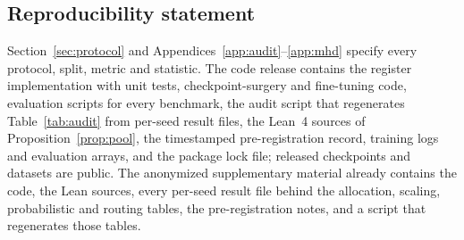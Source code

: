 \documentclass{article}
\begin{document}
\subsection*{Reproducibility statement}
Section~\ref{sec:protocol} and Appendices~\ref{app:audit}--\ref{app:mhd} specify every protocol, split, metric and
statistic. The code release contains the register implementation with unit tests, checkpoint-surgery and fine-tuning
code, evaluation scripts for every benchmark, the audit script that regenerates Table~\ref{tab:audit} from per-seed
result files, the Lean~4 sources of Proposition~\ref{prop:pool}, the timestamped pre-registration record, training
logs and evaluation arrays, and the package lock file; released checkpoints and datasets are public. The anonymized
supplementary material already contains the code, the Lean sources, every per-seed result file behind the allocation,
scaling, probabilistic and routing tables, the pre-registration notes, and a script that regenerates those tables.




\appendix
\end{document}
